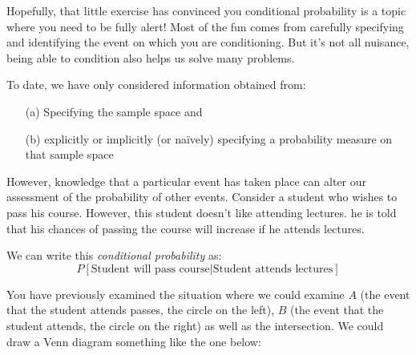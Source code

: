 \documentclass[12pt]{extbook}
\begin{document}
Hopefully, that little exercise has convinced you conditional probability is a topic where you need to be fully alert!   Most of the fun comes from carefully specifying and identifying the event on which you are conditioning.   But it's not all nuisance, being able to condition also helps us solve many problems.


To date, we have only considered information obtained from:


\begin{itemize}
\item[(a)] Specifying the sample space and
\item[(b)] explicitly or implicitly (or na\"ively) specifying a probability measure on that sample space
\end{itemize}

However, knowledge that a particular event has taken place can alter our assessment of the probability of other events.   Consider a student who wishes to pass his course.   However, this student doesn't like attending lectures.   he is told that his chances of passing the course will increase if he attends lectures.

We can write this \emph{conditional probability} as:
\begin{displaymath}
P[\mbox{Student will pass course} | \mbox{Student attends lectures}]
\end{displaymath}

 

You have previously examined the situation where we could examine $A$ (the event that the student attends passes, the circle on the left), $B$ (the event that the student attends, the circle on the right) as well as the intersection.   We could draw a Venn diagram something like the one below:


\def\firstcircle{(0,0) circle (1.5cm)}
\def\secondcircle{(0:2cm) circle (1.5cm)}



\setlength{\parskip}{5mm}
\end{document}

